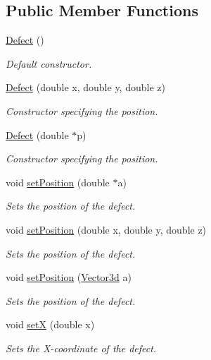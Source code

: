 \subsection*{Public Member Functions}
\begin{DoxyCompactItemize}
\item 
\hyperlink{classDefect_afc84dd2d7250a01746ee67b002dbbad9}{Defect} ()
\begin{DoxyCompactList}\small\item\em Default constructor. \end{DoxyCompactList}\item 
\hyperlink{classDefect_aaddcb1db4b47037adf2e495665f41bab}{Defect} (double x, double y, double z)
\begin{DoxyCompactList}\small\item\em Constructor specifying the position. \end{DoxyCompactList}\item 
\hyperlink{classDefect_a5bd123214102a5115c46b0a15653d29b}{Defect} (double $\ast$p)
\begin{DoxyCompactList}\small\item\em Constructor specifying the position. \end{DoxyCompactList}\item 
void \hyperlink{classDefect_a2d233d13a8a93f6fba463a1fbc1c6c9f}{set\-Position} (double $\ast$a)
\begin{DoxyCompactList}\small\item\em Sets the position of the defect. \end{DoxyCompactList}\item 
void \hyperlink{classDefect_ad1a6acd8399d2ecabb7ce2b77623bbec}{set\-Position} (double x, double y, double z)
\begin{DoxyCompactList}\small\item\em Sets the position of the defect. \end{DoxyCompactList}\item 
void \hyperlink{classDefect_a36ffa9b4b01d38ed8a95ca2c78973cc4}{set\-Position} (\hyperlink{classVector3d}{Vector3d} a)
\begin{DoxyCompactList}\small\item\em Sets the position of the defect. \end{DoxyCompactList}\item 
void \hyperlink{classDefect_a5a65f73da6a572d9e7109b31239e441d}{set\-X} (double x)
\begin{DoxyCompactList}\small\item\em Sets the X-\/coordinate of the defect. \end{DoxyCompactList}\item 

\end{DoxyCompactItemize}
